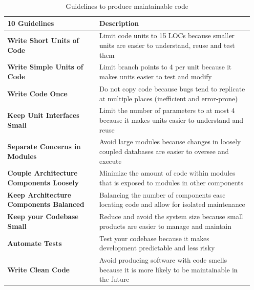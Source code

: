 \documentclass[10pt,conference]{IEEEtran}
\begin{document}
\begin{table}[h]
	\caption{Guidelines to produce maintainable code}
\begin{tabular}{L{2.5cm}L{5.5cm}}

\toprule
\textbf{10 Guidelines} & \textbf{Description}\\
\midrule
\textbf{Write Short Units of Code} & Limit code units to 15 LOCs because smaller
 units are easier to understand, reuse and test them\\\midrule
\textbf{Write Simple Units of Code} & Limit branch points to 4 per unit because
it makes units easier to test and modify \\\midrule
\textbf{Write Code Once} & Do not copy code because bugs tend to replicate at
multiple places (inefficient and error-prone)\\\midrule
\textbf{Keep Unit Interfaces Small} & Limit the number of parameters to at most
4 because it makes units easier to understand and reuse\\\midrule
\textbf{Separate Concerns in Modules} & Avoid large modules because changes in
loosely coupled databases are easier to oversee and execute\\\midrule
\textbf{Couple Architecture Components Loosely} & Minimize the amount of code
within modules that is exposed to modules in other components\\\midrule
\textbf{Keep Architecture Components Balanced} & Balancing the number of
components ease locating code and allow for isolated maintenance\\\midrule
\textbf{Keep your Codebase Small} & Reduce and avoid the system size because
small products are easier to manage and maintain\\\midrule
\textbf{Automate Tests} & Test your codebase because it makes development
predictable and less risky\\\midrule
\textbf{Write Clean Code} & Avoid producing software with code smells because
it is more likely to be maintainable in the future\\
\bottomrule
\end{tabular}
\label{tab:guidelines}
\end{table}
\end{document}
